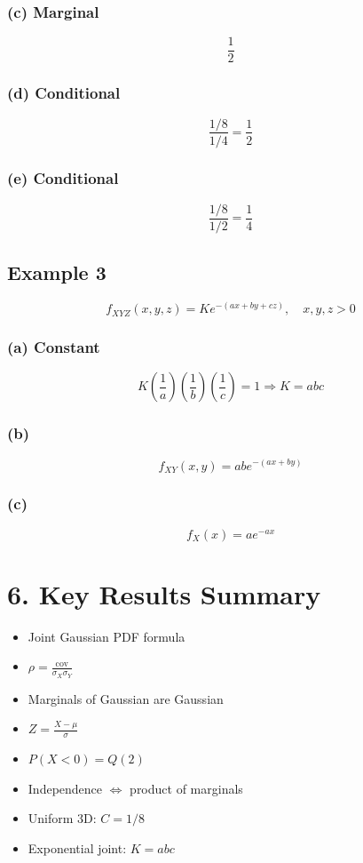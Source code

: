 \documentclass[12pt]{article}
\begin{document}
\subsubsection*{(c) Marginal}
\[
\frac{1}{2}
\]

\subsubsection*{(d) Conditional}
\[
\frac{1/8}{1/4}=\frac{1}{2}
\]

\subsubsection*{(e) Conditional}
\[
\frac{1/8}{1/2}=\frac{1}{4}
\]

\subsection*{Example 3}

\[
f_{XYZ}(x,y,z)=K e^{-(ax+by+cz)},\quad x,y,z>0
\]

\subsubsection*{(a) Constant}
\[
K\left(\frac{1}{a}\right)\left(\frac{1}{b}\right)\left(\frac{1}{c}\right)=1
\Rightarrow K=abc
\]

\subsubsection*{(b)}
\[
f_{XY}(x,y)=abe^{-(ax+by)}
\]

\subsubsection*{(c)}
\[
f_X(x)=ae^{-ax}
\]

\section*{6. Key Results Summary}

\begin{itemize}
\item Joint Gaussian PDF formula
\item $\rho=\frac{\text{cov}}{\sigma_X\sigma_Y}$
\item Marginals of Gaussian are Gaussian
\item $Z=\frac{X-\mu}{\sigma}$
\item $P(X<0)=Q(2)$
\item Independence $\Leftrightarrow$ product of marginals
\item Uniform 3D: $C=1/8$
\item Exponential joint: $K=abc$
\end{itemize}
\end{document}
